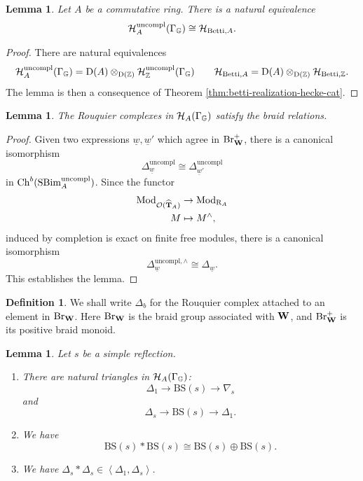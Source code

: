 \documentclass[a4paper, 10pt, oneside, reqno]{amsart}
\theoremstyle{plain}
\newtheorem{lem}[thm]{Lemma}
\theoremstyle{definition}
\newtheorem{defi}[thm]{Definition}
\theoremstyle{remark}
\newcommand{\Gbb}{\mathbb{G}}
\newcommand{\RR}{\mathrm{R}}
\newcommand{\BS}{\mathrm{BS}}
\newcommand{\Betti}{\mathrm{Betti}}
\newcommand{\uncompl}{\mathrm{uncompl}}
\begin{document}
\begin{lem}
Let $A$ be a commutative ring. There is a natural equivalence 
$$\Hcal^{\uncompl}_A(\Gamma_{\Gbb}) \cong \Hcal_{\Betti, A}.$$
\end{lem}

\begin{proof}
There are natural equivalences 
$$\Hcal^{\uncompl}_A(\Gamma_{\Gbb}) = \DD(A) \otimes_{\DD(\Z)} \Hcal^{\uncompl}_{\Z}(\Gamma_{\Gbb}) \qquad \Hcal_{\Betti, A} = \DD(A) \otimes_{\DD(\Z)} \Hcal_{\Betti, \Z}.$$
The lemma is then a consequence of Theorem \ref{thm:betti-realization-hecke-cat}.
\end{proof}

\begin{lem}\label{lem:Rouquier-complexes-braid-relations}
The Rouquier complexes in $\Hcal_A(\Gamma_{\Gbb})$ satisfy the braid relations. 
\end{lem} 

\begin{proof}
Given two expressions $\underline{w}, \underline{w}'$ which agree in $\mathrm{Br}_{\mathbf{W}}^+$, there is a canonical isomorphism 
$$\Delta_{\underline{w}}^{\uncompl} \cong \Delta_{\underline{w}'}^{\uncompl}$$ 
in $\Ch^b(\SBim_{A}^{\uncompl})$. Since the functor 
\begin{align*}
\Mod_{\Ocal(\widehat{\Tbf}_A)} &\to \Mod_{\RR_A}\\
M &\mapsto M^{\wedge},
\end{align*}
induced by completion is exact on finite free modules, there is a canonical isomorphism 
$$\Delta_{\underline{w}}^{\uncompl, \wedge} \cong \Delta_{\underline{w}}.$$
This establishes the lemma.
\end{proof}

\begin{defi}
We shall write $\Delta_b$ for the Rouquier complex attached to an element in $\mathrm{Br}_{\mathbf{W}}$. Here $\mathrm{Br}_{\mathbf{W}}$ is the braid group associated with $\mathbf{W}$, and $\mathrm{Br}_{\mathbf{W}}^{+}$ is its positive braid monoid.
\end{defi}

\begin{lem}\label{lem:rank-one-properties}
Let $s$ be a simple reflection.
\begin{enumerate}
\item There are natural triangles in $\Hcal_A(\Gamma_{\Gbb})$: 
$$\Delta_1 \to \BS(s) \to \nabla_s$$
and 
$$\Delta_s \to \BS(s) \to \Delta_1.$$
\item We have 
$$\BS(s) * \BS(s) \cong \BS(s) \oplus \BS(s).$$ 
\item We have $\Delta_s * \Delta_s \in \left\langle \Delta_1, \Delta_s \right\rangle$. 
\end{enumerate}
\end{lem}
\end{document}
